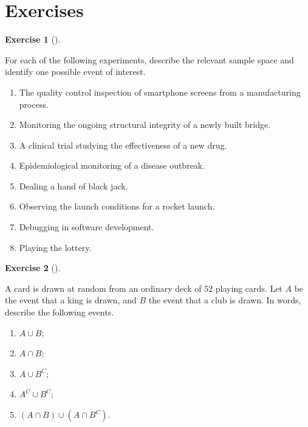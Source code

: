 \documentclass[
  letterpaper,
  DIV=11,
  numbers=noendperiod]{scrreprt}
\providecommand{\tightlist}{%
  \setlength{\itemsep}{0pt}\setlength{\parskip}{0pt}}\usepackage{longtable,booktabs,array}
\theoremstyle{definition}
\theoremstyle{definition}
\newtheorem{exercise}{Exercise}[chapter]
\theoremstyle{definition}
\theoremstyle{remark}
\begin{document}
\section*{Exercises}\label{exercises}


\begin{exercise}[]\protect\hypertarget{exr-2.1}{}\label{exr-2.1}

For each of the following experiments, describe the relevant sample
space and identify one possible event of interest.

\begin{enumerate}
\def\labelenumi{\alph{enumi}.}
\tightlist
\item
  The quality control inspection of smartphone screens from a
  manufacturing process.
\item
  Monitoring the ongoing structural integrity of a newly built bridge.
\item
  A clinical trial studying the effectiveness of a new drug.
\item
  Epidemiological monitoring of a disease outbreak.
\item
  Dealing a hand of black jack.
\item
  Observing the launch conditions for a rocket launch.
\item
  Debugging in software development.
\item
  Playing the lottery.
\end{enumerate}

\end{exercise}

\begin{exercise}[]\protect\hypertarget{exr-2.2}{}\label{exr-2.2}

A card is drawn at random from an ordinary deck of \(52\) playing cards.
Let \(A\) be the event that a king is drawn, and \(B\) the event that a
club is drawn. In words, describe the following events.

\begin{enumerate}
\def\labelenumi{\alph{enumi}.}
\tightlist
\item
  \(A\cup B\);
\item
  \(A \cap B\);
\item
  \(A\cup B^C\);
\item
  \(A^C\cup B^C\);
\item
  \((A\cap B)\cup(A\cap B^C)\).
\end{enumerate}

\end{exercise}
\end{document}
